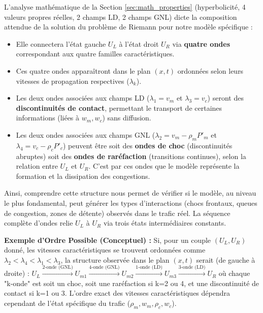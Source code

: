 L'analyse mathématique de la Section \ref{sec:math_properties} (hyperbolicité, 4 valeurs propres réelles, 2 champs LD, 2 champs GNL) dicte la composition attendue de la solution du problème de Riemann pour notre modèle spécifique :
\begin{itemize}
    \item Elle connectera l'état gauche \( U_L \) à l'état droit \( U_R \) via \textbf{quatre ondes} correspondant aux quatre familles caractéristiques.
    \item Ces quatre ondes apparaîtront dans le plan \( (x, t) \) ordonnées selon leurs vitesses de propagation respectives (\(\lambda_k\)).
    \item Les deux ondes associées aux champs LD (\(\lambda_1 = v_m\) et \(\lambda_3 = v_c\)) seront des \textbf{discontinuités de contact}, permettant le transport de certaines informations (liées à \(w_m, w_c\)) sans diffusion.
    \item Les deux ondes associées aux champs GNL (\(\lambda_2 = v_m - \rho_m P'_m\) et \(\lambda_4 = v_c - \rho_c P'_c\)) peuvent être soit des \textbf{ondes de choc} (discontinuités abruptes) soit des \textbf{ondes de raréfaction} (transitions continues), selon la relation entre \(U_L\) et \(U_R\). C'est par ces ondes que le modèle représente la formation et la dissipation des congestions.
\end{itemize}
Ainsi, comprendre cette structure nous permet de vérifier si le modèle, au niveau le plus fondamental, peut générer les types d'interactions (chocs frontaux, queues de congestion, zones de détente) observés dans le trafic réel. La séquence complète d'ondes relie \( U_L \) à \( U_R \) via trois états intermédiaires constants.

\textbf{Exemple d'Ordre Possible (Conceptuel) :} Si, pour un couple \( (U_L, U_R) \) donné, les vitesses caractéristiques se trouvent ordonnées comme \( \lambda_2 < \lambda_4 < \lambda_1 < \lambda_3 \), la structure observée dans le plan \( (x, t) \) serait (de gauche à droite) :
\( U_L \xrightarrow{\text{2-onde (GNL)}} U_{m1} \xrightarrow{\text{4-onde (GNL)}} U_{m2} \xrightarrow{\text{1-onde (LD)}} U_{m3} \xrightarrow{\text{3-onde (LD)}} U_R \)
où chaque "k-onde" est soit un choc, soit une raréfaction si k=2 ou 4, et une discontinuité de contact si k=1 ou 3. L'ordre exact des vitesses caractéristiques dépendra cependant de l'état spécifique du trafic (\(\rho_m, w_m, \rho_c, w_c\)).

